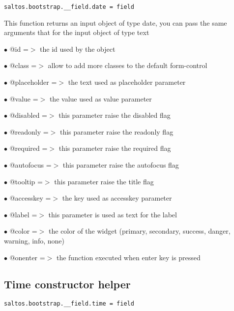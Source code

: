 \documentclass[a4paper]{book}
\begin{document}
\begin{lstlisting}
saltos.bootstrap.__field.date = field
\end{lstlisting}

This function returns an input object of type date, you can pass the same arguments
that for the input object of type text

\begin{compactitem}
\item[\color{myblue}$\bullet$] @id          =$>$ the id used by the object
\item[\color{myblue}$\bullet$] @class       =$>$ allow to add more classes to the default form-control
\item[\color{myblue}$\bullet$] @placeholder =$>$ the text used as placeholder parameter
\item[\color{myblue}$\bullet$] @value       =$>$ the value used as value parameter
\item[\color{myblue}$\bullet$] @disabled    =$>$ this parameter raise the disabled flag
\item[\color{myblue}$\bullet$] @readonly    =$>$ this parameter raise the readonly flag
\item[\color{myblue}$\bullet$] @required    =$>$ this parameter raise the required flag
\item[\color{myblue}$\bullet$] @autofocus   =$>$ this parameter raise the autofocus flag
\item[\color{myblue}$\bullet$] @tooltip     =$>$ this parameter raise the title flag
\item[\color{myblue}$\bullet$] @accesskey   =$>$ the key used as accesskey parameter
\item[\color{myblue}$\bullet$] @label       =$>$ this parameter is used as text for the label
\item[\color{myblue}$\bullet$] @color       =$>$ the color of the widget (primary, secondary, success, danger, warning, info, none)
\item[\color{myblue}$\bullet$] @onenter     =$>$ the function executed when enter key is pressed
\end{compactitem}

\hypertarget{toc466}{}
\subsection{Time constructor helper}

\begin{lstlisting}
saltos.bootstrap.__field.time = field
\end{lstlisting}
\end{document}
